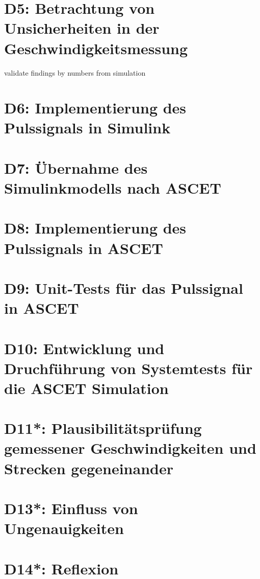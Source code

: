 \chapter{D5: Betrachtung von Unsicherheiten in der Geschwindigkeitsmessung}\label{cha:D5}
validate findings by numbers from simulation

\chapter{D6: Implementierung des Pulssignals in Simulink}\label{cha:D6}

\chapter{D7: Übernahme des Simulinkmodells nach ASCET}\label{cha:D7}

\chapter{D8: Implementierung des Pulssignals in ASCET}\label{cha:D8}

\chapter{D9: Unit-Tests für das Pulssignal in ASCET}\label{cha:D9}

\chapter{D10: Entwicklung und Druchführung von Systemtests für die ASCET Simulation}\label{cha:D10}

\chapter{D11*: Plausibilitätsprüfung gemessener Geschwindigkeiten und  Strecken gegeneinander}\label{cha:D11}

\chapter{D13*: Einfluss von Ungenauigkeiten}\label{cha:D13}

\chapter{D14*: Reflexion}\label{cha:D14}